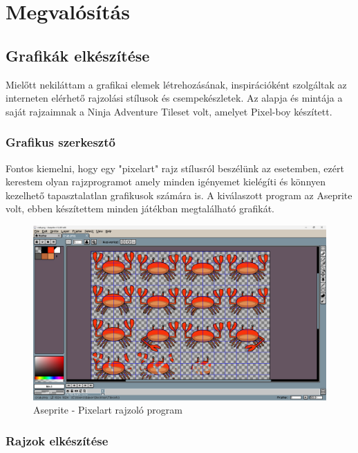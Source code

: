 \chapter{Megvalósítás}

\section{Grafikák elkészítése}

\indent \indent Mielőtt nekiláttam a grafikai elemek létrehozásának, inspirációként szolgáltak az interneten elérhető rajzolási stílusok és csempekészletek. Az alapja és mintája a saját rajzaimnak a Ninja Adventure Tileset volt, amelyet Pixel-boy készített.\cite{NAT}

\subsection{Grafikus szerkesztő}

\indent \indent Fontos kiemelni, hogy egy "pixelart" rajz stílusról beszélünk az esetemben, ezért kerestem olyan rajzprogramot amely minden igényemet kielégíti és könnyen kezelhető tapasztalatlan grafikusok számára is. A kiválaszott program az Aseprite volt, ebben készítettem minden játékban megtalálható grafikát.

\begin{figure}[H]
    \centering
    \includegraphics[width=14.0truecm]{images/Aseprite.png}
    \caption{Aseprite - Pixelart rajzoló program
    \cite{Aseprite}}

    \label{fig:Aseprite}
\end{figure}


\subsection{Rajzok elkészítése}

